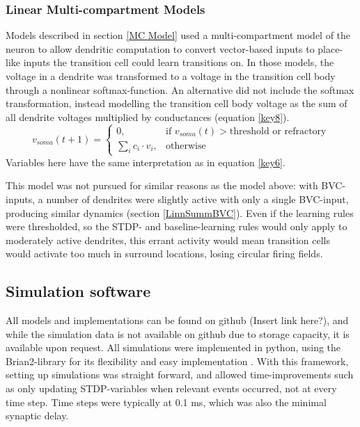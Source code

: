 \documentclass{article}
\begin{document}
    \subsubsection{Linear Multi-compartment Models} \label{Lin MCModel}

    Models described in section \ref{MC Model} used a multi-compartment model of the neuron to allow dendritic computation to convert vector-based inputs to place-like inputs the transition cell could learn transitions on. In those models, the voltage in a dendrite was transformed to a voltage in the transition cell body through a nonlinear softmax-function. An alternative did not include the softmax transformation, instead modelling the transition cell body voltage as the sum of all dendrite voltages multiplied by conductances (equation \ref{key8}). \begin{equation}\label{key8} v_{soma}(t + 1) = \begin{cases} 0, & \text{if } v_{soma}(t) > \text{threshold or refractory}\\
        \sum_{i}^{} c_i \cdot v_i, & \text{otherwise} \end{cases}\end{equation} 
    Variables here have the same interpretation as in equation \ref{key6}.

    This model was not pursued for similar reasons as the model above: with BVC-inputs, a number of dendrites were slightly active with only a single BVC-input, producing similar dynamics (section \ref{LinnSummBVC}). Even if the learning rules were thresholded, so the STDP- and baseline-learning rules would only apply to moderately active dendrites, this errant activity would mean transition cells would activate too much in surround locations, losing circular firing fields.

    \subsection{Simulation software} \label{Sim software}
    
    All models and implementations can be found on github (Insert link here?), and while the simulation data is not available on github due to storage capacity, it is available upon request. All simulations were implemented in python, using the Brian2-library for its flexibility and easy implementation \parencite{Brian2}. With this framework, setting up simulations was straight forward, and allowed time-improvements such as only updating STDP-variables when relevant events occurred, not at every time step. Time steps were typically at 0.1 ms, which was also the minimal synaptic delay.
    
\end{document}
